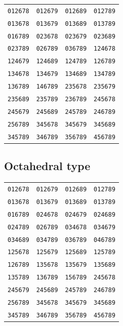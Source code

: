 \documentclass[11pt]{article}
\theoremstyle{definition}
\begin{document}
\begin{center}
\small
\begin{tabular}{llll}
\toprule
\texttt{012678}&\texttt{012679}&\texttt{012689}&\texttt{012789}\\
\texttt{013678}&\texttt{013679}&\texttt{013689}&\texttt{013789}\\
\texttt{016789}&\texttt{023678}&\texttt{023679}&\texttt{023689}\\
\texttt{023789}&\texttt{026789}&\texttt{036789}&\texttt{124678}\\
\texttt{124679}&\texttt{124689}&\texttt{124789}&\texttt{126789}\\
\texttt{134678}&\texttt{134679}&\texttt{134689}&\texttt{134789}\\
\texttt{136789}&\texttt{146789}&\texttt{235678}&\texttt{235679}\\
\texttt{235689}&\texttt{235789}&\texttt{236789}&\texttt{245678}\\
\texttt{245679}&\texttt{245689}&\texttt{245789}&\texttt{246789}\\
\texttt{256789}&\texttt{345678}&\texttt{345679}&\texttt{345689}\\
\texttt{345789}&\texttt{346789}&\texttt{356789}&\texttt{456789}\\
\bottomrule
\end{tabular}
\end{center}

\subsection*{Octahedral type}

\begin{center}
\small
\begin{tabular}{llll}
\toprule
\texttt{012678}&\texttt{012679}&\texttt{012689}&\texttt{012789}\\
\texttt{013678}&\texttt{013679}&\texttt{013689}&\texttt{013789}\\
\texttt{016789}&\texttt{024678}&\texttt{024679}&\texttt{024689}\\
\texttt{024789}&\texttt{026789}&\texttt{034678}&\texttt{034679}\\
\texttt{034689}&\texttt{034789}&\texttt{036789}&\texttt{046789}\\
\texttt{125678}&\texttt{125679}&\texttt{125689}&\texttt{125789}\\
\texttt{126789}&\texttt{135678}&\texttt{135679}&\texttt{135689}\\
\texttt{135789}&\texttt{136789}&\texttt{156789}&\texttt{245678}\\
\texttt{245679}&\texttt{245689}&\texttt{245789}&\texttt{246789}\\
\texttt{256789}&\texttt{345678}&\texttt{345679}&\texttt{345689}\\
\texttt{345789}&\texttt{346789}&\texttt{356789}&\texttt{456789}\\
\bottomrule
\end{tabular}
\end{center}



\end{document}
